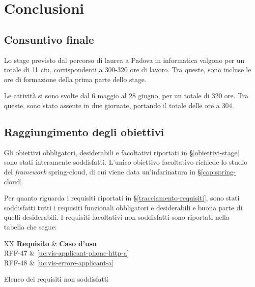 
\chapter{Conclusioni}\label{cap:conclusioni}


\section{Consuntivo finale}

Lo stage previsto dal percorso di laurea a Padova in informatica valgono per un totale di 11 \gls{cfu}, corrispondenti a 300-320 ore di lavoro. Tra queste, sono incluse le ore di formazione della prima parte dello stage.

Le attività si sono svolte dal 6 maggio al 28 giugno, per un totale di 320 ore. Tra queste, sono stato assente in due giornate, portando il totale delle ore a 304.

\section{Raggiungimento degli obiettivi}
Gli obiettivi obbligatori, desiderabili e facoltativi riportati in \S\ref{obiettivi-stage} sono stati interamente soddisfatti. L'unico obiettivo facoltativo richiede lo studio del \textit{framework} \gls{spring-cloud}, di cui viene data un'infarinatura in \S\ref{cap:spring-cloud}.

Per quanto riguarda i requisiti riportati in \S\ref{tracciamento-requisiti}, sono stati soddisfatti tutti i requisiti funzionali obbligatori e desiderabili e buona parte di quelli desiderabili. 
I requisiti facoltativi non soddisfatti sono riportati nella tabella che segue:

\begin{table}[H]
	\centering
	\begin{paddedtablex}[1.4]{0.5\textwidth}{XX}
		\textbf{Requisito} & \textbf{Caso d'uso}\\
		\toprule
		RFF-47 & \ref{uc:vis-applicant-phone-http-a}\\
		RFF-48 & \ref{uc:vis-errore-applicant-a}\\
		\bottomrule
	\end{paddedtablex}
	\vspace{4pt}
	\caption{Elenco dei requisiti non soddisfatti}
\end{table}

